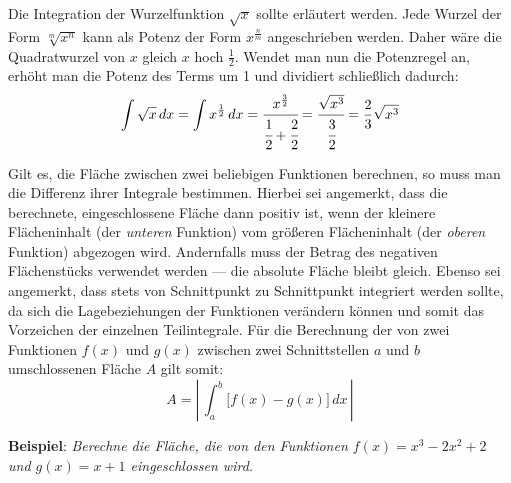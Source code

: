 \vspace{\parskip}

Die Integration der Wurzelfunktion $\sqrt{x}$ sollte erl\"{a}utert werden. Jede Wurzel der Form $\sqrt[m]{x^n}$ kann als Potenz der Form $x^{\frac{n}{m}}$ angeschrieben werden. Daher w\"{a}re die Quadratwurzel von $x$ gleich $x$ hoch $\frac{1}{2}$. Wendet man nun die Potenzregel an, erh\"{o}ht man die Potenz des Terms um 1 und dividiert schlie\ss{}lich dadurch: $$\int \sqrt{x} \,dx = \int x^{\frac{1}{2}} \,dx = \cfrac{x^{\frac{3}{2}}}{\cfrac{1}{2} + \cfrac{2}{2}} = \cfrac{\sqrt{x^3}}{\cfrac{3}{2}} = \frac{2}{3} \sqrt{x^3}$$

\pagebreak


Gilt es, die Fl\"{a}che zwischen zwei beliebigen Funktionen berechnen, so muss man die Differenz ihrer Integrale bestimmen. Hierbei sei angemerkt, dass die berechnete, eingeschlossene Fl\"{a}che dann positiv ist, wenn der kleinere Fl\"{a}cheninhalt (der \emph{unteren} Funktion) vom gr\"{o}\ss{}eren Fl\"{a}cheninhalt (der \emph{oberen} Funktion) abgezogen wird. Andernfalls muss der Betrag des negativen Fl\"{a}chenst\"{u}cks verwendet werden --- die absolute Fl\"{a}che bleibt gleich. Ebenso sei angemerkt, dass stets von Schnittpunkt zu Schnittpunkt integriert werden sollte, da sich die Lagebeziehungen der Funktionen ver\"{a}ndern k\"{o}nnen und somit das Vorzeichen der einzelnen Teilintegrale. F\"{u}r die Berechnung der von zwei Funktionen $f(x)$ und $g(x)$ zwischen zwei Schnittstellen $a$ und $b$ umschlossenen Fl\"{a}che $A$ gilt somit: $$A = \left| \, \int_a^b \big[f(x) - g(x)\big] \, dx \, \right|$$

\textbf{Beispiel}: \emph{Berechne die Fl\"{a}che, die von den Funktionen $f(x) = x^3 - 2x^2 + 2$ und $g(x) = x + 1$ eingeschlossen wird.}

\extrapar

\begin{figure}[h!]
	\centering
\end{figure}

